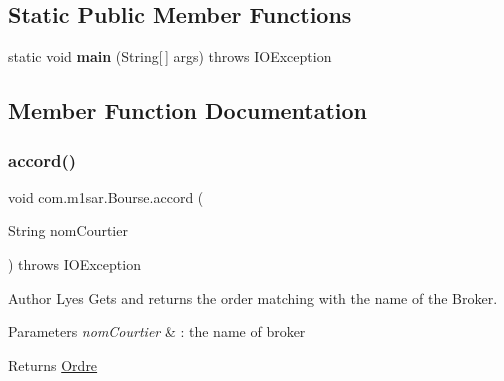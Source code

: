 \subsection*{Static Public Member Functions}
\begin{DoxyCompactItemize}
\item 
\mbox{\label{classcom_1_1m1sar_1_1_bourse_a5bbb0315c9e6fe1c74d6f112eefaf847}} 
static void {\bfseries main} (String\mbox{[}$\,$\mbox{]} args)  throws I\+O\+Exception
\end{DoxyCompactItemize}


\subsection{Member Function Documentation}
\mbox{\label{classcom_1_1m1sar_1_1_bourse_aa084f404d85f7292a1238ebc38ceac09}} 
\subsubsection{\texorpdfstring{accord()}{accord()}}
{\footnotesize\ttfamily void com.\+m1sar.\+Bourse.\+accord (\begin{DoxyParamCaption}\item[{String}]{nom\+Courtier }\end{DoxyParamCaption}) throws I\+O\+Exception}

\begin{DoxyAuthor}{Author}
Lyes Gets and returns the order matching with the name of the Broker. 
\end{DoxyAuthor}

\begin{DoxyParams}{Parameters}
{\em nom\+Courtier} & \+: the name of broker \\
\hline
\end{DoxyParams}
\begin{DoxyReturn}{Returns}
{\ttfamily \hyperlink{classcom_1_1m1sar_1_1_ordre}{Ordre}} 
\end{DoxyReturn}
\mbox{\label{classcom_1_1m1sar_1_1_bourse_aeb40be5d0f691a90eb1f6629f42e56de}} 
